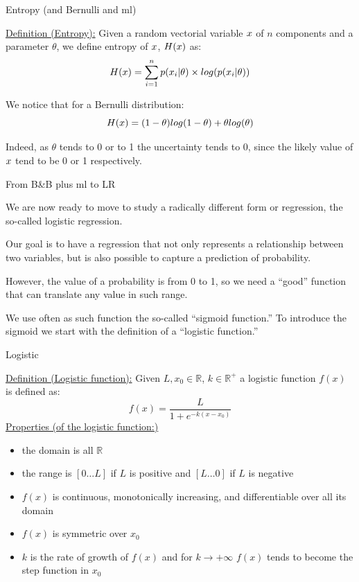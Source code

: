 \documentclass{beamer}
\begin{document}
\begin{frame}
{\centerline{Entropy (and Bernulli and ml)}}

\underline{Definition (Entropy):} Given a random vectorial variable $\boldmath{x}$ of $n$ components and a parameter $\theta$, we define entropy of $\boldmath{x}$, $H(\boldmath{x})$ as:
$$H(\boldmath{x}) = \sum_{i=1}^{n} p(x_i|\theta) \times log (p(x_i|\theta)) $$

We notice that for a Bernulli distribution:
$$ H(\boldmath{x}) = (1-\theta) log (1-\theta) + \theta log(\theta)$$

Indeed, as $\theta$ tends to 0 or to 1 the uncertainty tends to 0, since the likely value of $\boldmath{x}$ tend to be 0 or 1 respectively.

\end{frame}

\begin{frame}
{\centerline{From B\&B plus ml to LR}}
We are now ready to move to study a radically different form or regression, the so-called logistic regression.
\newline

Our goal is to have a regression that not only represents a relationship between two variables, but is also possible to capture a prediction of probability.
\newline

However, the value of a probability is from 0 to 1, so we need a ``good'' function that can translate any value in such range.
\newline

We use often as such function the so-called ``sigmoid function.'' To introduce the sigmoid we start with the definition of a ``logistic function.''

\end{frame}

\begin{frame}
{\centerline{Logistic}}
\underline{Definition (Logistic function):} Given $L, x_0 \in \mathbb{R}$, $k \in \mathbb{R}^+$ a
logistic function $f(x)$ is defined as: 
$$ f(x) = \dfrac{L}{1+e^{-k(x-x_0)}}$$
\underline{Properties (of the logistic function:)}
\begin{itemize}
\item the domain is all $\mathbb{R}$
\item the range is $[0 \ldots L]$ if $L$ is positive and $[L \ldots 0]$ if $L$ is negative
\item $f(x)$ is continuous, monotonically increasing, and differentiable  over all its domain
\item $f(x)$ is symmetric over $x_0$
\item $k$ is the rate of growth of $f(x)$ and for $k \to +\infty$ $f(x)$ tends to become the step function in $x_0$
\end{itemize}

\end{frame}
\end{document}
